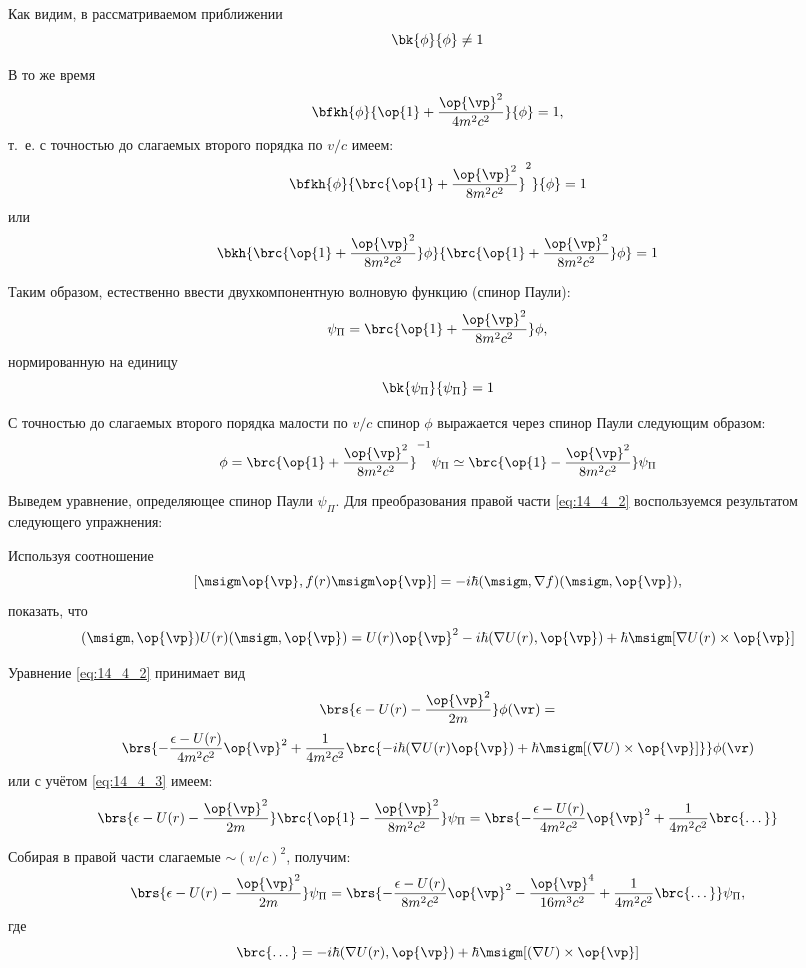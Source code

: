 Как видим, в рассматриваемом приближении
$$
\bk{\phi}{\phi} \neq 1
$$

В то же время
$$
\bfkh{\phi}{\op{1} + \frac{\op{\vp}^2}{4m^2c^2}}{\phi} = 1,
$$
т.~е. с точностью до слагаемых второго порядка по $v/c$ имеем:
$$
\bfkh{\phi}{\brc{\op{1} + \frac{\op{\vp}^2}{8m^2c^2}}^2}{\phi} = 1
$$
или
$$
\bkh{\brc{\op{1} + \frac{\op{\vp}^2}{8m^2c^2}}\phi}{\brc{\op{1} + \frac{\op{\vp}^2}{8m^2c^2}}\phi} = 1
$$

Таким образом, естественно ввести двухкомпонентную волновую функцию (спинор Паули):
$$
\psi_\Pi = \brc{\op{1} + \frac{\op{\vp}^2}{8m^2c^2}} \phi,
$$
нормированную на единицу
$$
\bk{\psi_\Pi}{\psi_\Pi} = 1
$$

С точностью до слагаемых второго порядка малости по $v/c$ спинор $\phi$ выражается через спинор Паули следующим образом:
\begin{equation}
\label{eq:14_4_3}
\phi = \brc{\op{1} + \frac{\op{\vp}^2}{8m^2c^2}}^{-1} \psi_\Pi \simeq \brc{\op{1} - \frac{\op{\vp}^2}{8m^2c^2}} \psi_\Pi
\end{equation}

Выведем уравнение, определяющее спинор Паули $\psi_\Pi$. Для преобразования правой части \eqref{eq:14_4_2} воспользуемся результатом следующего упражнения:

\begin{excr}
Используя соотношение 
$$
[\msigm \op{\vp}, f(r) \msigm \op{\vp}] = -i\hbar (\msigm, \nabla f)(\msigm, \op{\vp}),
$$
показать, что
$$
(\msigm, \op{\vp}) U(r) (\msigm, \op{\vp}) = U(r) \op{\vp}^2 - i \hbar (\nabla U(r), \op{\vp}) + \hbar \msigm [\nabla U(r) \times \op{\vp}]
$$
\end{excr}

Уравнение \eqref{eq:14_4_2} принимает вид
$$
\brs{\epsilon - U(r) - \frac{\op{\vp}^2}{2m}}\phi(\vr) =
$$
$$
\brs{- \frac{\epsilon - U(r)}{4m^2c^2}\op{\vp}^2 + \frac{1}{4m^2 c^2} \brc{-i\hbar (\nabla U(r) \op{\vp}) + \hbar \msigm [(\nabla U) \times \op{\vp}]}} \phi(\vr)
$$
или с учётом \eqref{eq:14_4_3} имеем:
$$
\brs{\epsilon - U(r) - \frac{\op{\vp}^2}{2m}}\brc{\op{1} - \frac{\op{\vp}^2}{8m^2c^2}} \psi_\Pi = \brs{- \frac{\epsilon - U(r)}{4m^2c^2}\op{\vp}^2 + \frac{1}{4m^2 c^2} \brc{\dots}}
$$

Собирая в правой части слагаемые $\sim (v/c)^2$, получим:
$$
\brs{\epsilon - U(r) - \frac{\op{\vp}^2}{2m}}\psi_\Pi = \brs{- \frac{\epsilon - U(r)}{8m^2c^2}\op{\vp}^2 -\frac{\op{\vp}^4}{16m^3 c^2}+ \frac{1}{4m^2 c^2} \brc{\dots}} \psi_\Pi,
$$
где 
\begin{equation}
\label{eq:14_4_4}
\brc{\dots} = -i\hbar (\nabla U(r), \op{\vp}) + \hbar \msigm [(\nabla U) \times \op{\vp}]
\end{equation}

